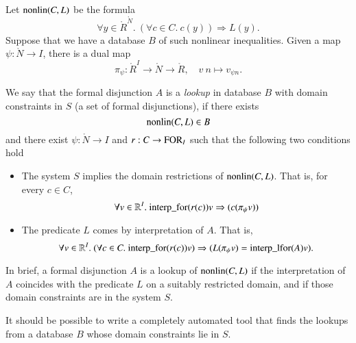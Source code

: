 Let ${\operatorname{nonlin}}(C,L)$ be the formula
    $$
    \forall y\in\ring{R}^\ring{N}.\ (\forall c\in C.\
    c(y)) \Rightarrow L(y).
    $$
Suppose that we have a database $B$ of such nonlinear
inequalities.  Given a map $\psi:\ring{N}\to I$, there is a dual
map
    $$
    \pi_\psi: \ring{R}^I \to \ring{N}\to \ring{R},\quad v\ n\mapsto
    v_{\psi n}.
    $$


\begin{definition}
    We say that the formal disjunction $A$ is a {\it lookup} in
    database $B$ with domain constraints in $S$ (a set of formal disjunctions),
    if there exists
        $$
        {\operatorname{nonlin}}(C,L)\in B
        $$
    and there exist $\psi:\ring{N}\to I$ and
    $r:C\to{\operatorname{FOR}}_I$
    such that the following two conditions hold
    \begin{itemize}
    \item The system $S$ implies the domain restrictions of
    ${\operatorname{nonlin}}(C,L)$.  That is, for every $c \in C$,
        $$
        \forall v\in\mathbb{R}^I.\ {\operatorname{interp\_for}} (r(c)) v
        \Rightarrow (c(\pi_\psi v))
        $$
    \item The predicate $L$ comes by interpretation of $A$.  That
    is,
        $$
        \forall v\in \mathbb{R}^I.\ (\forall c\in C.\ {\operatorname{interp\_for}}(r(c)) v)
        \Rightarrow (L(\pi_\psi v) =
        {\operatorname{interp\_lfor}}(A) v).
        $$
    \end{itemize}
\end{definition}


In brief, a formal disjunction $A$ is a lookup of
${\operatorname{nonlin}}(C,L)$ if the interpretation of $A$ coincides with the
predicate $L$ on a suitably restricted domain, and if those domain
constraints are in the system $S$.

It should be possible to write a completely automated tool that
finds the lookups from a database $B$ whose domain constraints lie
in $S$.

